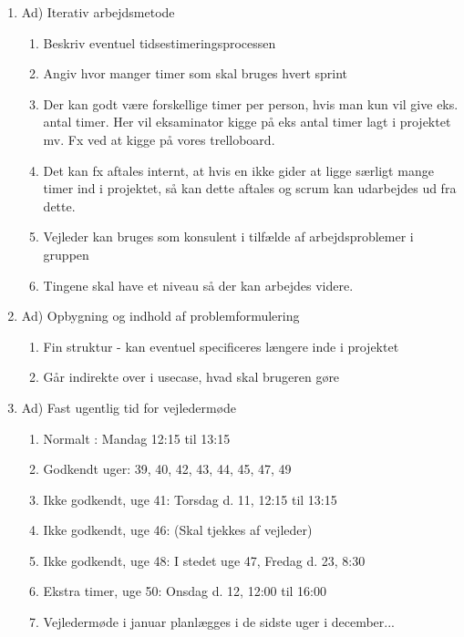 \begin{enumerate}
    \item Ad) Iterativ arbejdsmetode
    \begin{enumerate}
        \item Beskriv eventuel tidsestimeringsprocessen
        \item Angiv hvor manger timer som skal bruges hvert sprint  
        \item Der kan godt være forskellige timer per person, hvis man kun vil give eks. antal timer. Her vil eksaminator kigge på eks antal timer lagt i projektet mv. Fx ved at kigge på vores trelloboard. 
        \item Det kan fx aftales internt, at hvis en ikke gider at ligge særligt mange timer ind i projektet, så kan dette aftales og scrum kan udarbejdes ud fra dette. 
        \item Vejleder kan bruges som konsulent i tilfælde af arbejdsproblemer i gruppen
        \item Tingene skal have et niveau så der kan arbejdes videre. 
    \end{enumerate}
    
    \item Ad) Opbygning og indhold af problemformulering
    \begin{enumerate}
        \item Fin struktur - kan eventuel specificeres længere inde i projektet 
        \item Går indirekte over i usecase, hvad skal brugeren gøre 
    \end{enumerate}
    
    \item Ad) Fast ugentlig tid for vejledermøde
    \begin{enumerate}
        \item Normalt : Mandag 12:15 til 13:15 
        \item Godkendt uger: 39, 40, 42, 43, 44, 45, 47, 49
        \item Ikke godkendt, uge 41:  Torsdag d. 11, 12:15 til 13:15 
        \item Ikke godkendt, uge 46:  (Skal tjekkes af vejleder) 
        \item Ikke godkendt, uge 48:  I stedet uge 47, Fredag d. 23, 8:30 
        \item Ekstra timer,  uge 50:  Onsdag d. 12, 12:00 til 16:00   
        \item Vejledermøde i januar planlægges i de sidste uger i december...
    \end{enumerate}

    
 \end{enumerate}
